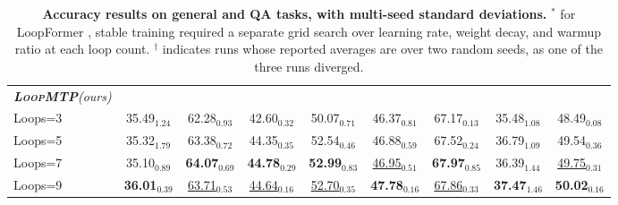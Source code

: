\begin{table}[t]
{\begin{tabular}{
        l |
        c c c c c c c c
        }
        \rowcolor{lightgray} \textit{\textbf{\textsc{LoopMTP}}\small(ours)\normalsize} &&&&&&&&\\
        \rowcolor{lightgray} \quad Loops=3 & 35.49$_{1.24}$ & 62.28$_{0.93}$ & 42.60$_{0.32}$ & 50.07$_{0.71}$ & 46.37$_{0.81}$ & 67.17$_{0.13}$ & 35.48$_{1.08}$ & 48.49$_{0.08}$\\
        \rowcolor{lightgray} \quad Loops=5 & 35.32$_{1.79}$ & 63.38$_{0.72}$ & 44.35$_{0.35}$ & 52.54$_{0.46}$ & 46.88$_{0.59}$ & 67.52$_{0.24}$ & 36.79$_{1.09}$ & 49.54$_{0.36}$\\
        \rowcolor{lightgray} \quad Loops=7 & 35.10$_{0.89}$ & \textbf{64.07$_{0.69}$} & \textbf{44.78$_{0.29}$} & \textbf{52.99$_{0.83}$} & \underline{46.95}$_{0.51}$ & \textbf{67.97$_{0.85}$} & 36.39$_{1.44}$ & \underline{49.75}$_{0.31}$\\
        \rowcolor{lightgray} \quad Loops=9 & \textbf{36.01$_{0.39}$} & \underline{63.71}$_{0.53}$ & \underline{44.64}$_{0.16}$ & \underline{52.70}$_{0.35}$ & \textbf{47.78$_{0.16}$} & \underline{67.86}$_{0.33}$ & \textbf{37.47$_{1.46}$} & \textbf{50.02$_{0.16}$}\\
    \bottomrule
    \end{tabular}
    }
    \caption{\textbf{Accuracy results on general and QA tasks, with multi-seed standard deviations.}
    $^*$ for LoopFormer \cite{jeddi2026loopformer}, stable training required a separate grid search over learning rate, weight decay, and warmup ratio at each loop count. $^\dagger$ indicates runs whose reported averages are over two random seeds, as one of the three runs diverged.}
    \label{tab:acc_general_results}
\end{table}




